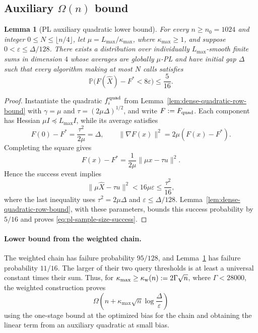 \documentclass{article}
\newtheorem{lemma}[theorem]{Lemma}
\theoremstyle{definition}
\newcommand{\Prob}{\mathbb{P}}
\begin{document}
\subsection{Auxiliary \texorpdfstring{$\Omega(n)$}{Omega(n)} bound}

\begin{lemma}[PL auxiliary quadratic lower bound]
\label{lem:pl-sample-size}
For every $n\ge n_0=1024$ and integer $0\le N\le\lfloor n/4\rfloor$, let
$\mu=L_{\max}/\kappa_{\max}$, where $\kappa_{\max}\ge1$, and suppose
$0<\varepsilon\le\Delta/128$.  There exists a distribution over individually
$L_{\max}$-smooth finite sums in dimension $4$ whose averages are globally $\mu$-PL and have
initial gap $\Delta$ such that every algorithm making at most $N$ calls
satisfies
\begin{equation}
 \Prob\bigl(F(\widehat X)-F^*<8\varepsilon\bigr)\le\frac5{16}.
 \label{eq:pl-sample-size-success}
\end{equation}
\end{lemma}

\begin{proof}
Instantiate the quadratic $f_i^{\rm quad}$ from
Lemma~\ref{lem:dense-quadratic-row-bound} with
$\gamma=\mu$ and $\tau=(2\mu\Delta)^{1/2}$, and write
$F:=F_{\rm quad}$.  Each component has Hessian
$\mu I\preceq L_{\max}I$, while its average satisfies
\begin{equation}
 F(0)-F^*=\frac{\tau^2}{2\mu}=\Delta,
 \qquad
 \|\nabla F(x)\|^2=2\mu(F(x)-F^*).
\end{equation}
Completing the square gives
\begin{equation}
 F(x)-F^*=\frac1{2\mu}\|\mu x-\tau u\|^2.
\end{equation}
Hence the success event implies
\begin{equation}
 \|\mu\widehat X-\tau u\|^2
 <16\mu\varepsilon
 \le\frac{\tau^2}{16},
\end{equation}
where the last inequality uses $\tau^2=2\mu\Delta$ and
$\varepsilon\le\Delta/128$.  Lemma~\ref{lem:dense-quadratic-row-bound}, with
these parameters, bounds this success probability by $5/16$ and proves
\eqref{eq:pl-sample-size-success}.
\end{proof}

\paragraph{Lower bound from the weighted chain.}
The weighted chain has failure probability $95/128$, and
Lemma~\ref{lem:pl-sample-size} has failure probability $11/16$.
The larger of their two query thresholds is at least a universal constant
times their sum.  Thus, for
$\kappa_{\max}\ge\kappa_{\rm w}(n):=2\Gamma\sqrt n$, where $\Gamma<28000$,
the weighted
construction proves
\begin{equation}
 \Omega\!\left(
 n+\kappa_{\max}\sqrt n
 \log\frac{\Delta}{\varepsilon}
 \right)
 \label{eq:weighted-pl-summary}
\end{equation}
using the one-stage bound at the optimized bias for the chain and obtaining the
linear term from an auxiliary quadratic at small bias.
\end{document}

